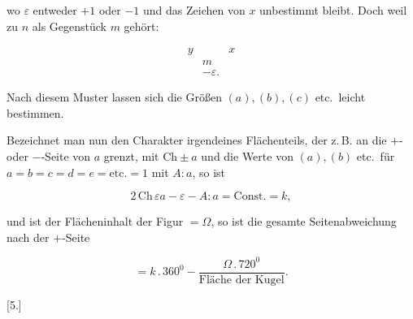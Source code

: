 %
\noindent wo $\varepsilon$ entweder $+1$ oder $-1$ und das Zeichen von $x$
unbestimmt bleibt. Doch weil zu $n$ als Gegenstück $m$ gehört:

\[
\begin{array}{ccc}
y&&x \\
&m& \\
&-\varepsilon.&
\end{array}
\]

\noindent Nach diesem Muster lassen sich die Größen $(a), (b),
(c)$ etc.\ leicht bestimmen.

Bezeichnet man nun den Charakter irgendeines Flächenteils, der
z.\,B. an die $+$- oder $-$-Seite von $a$ grenzt, mit $\mathrm{Ch}\pm a$
und die Werte von $(a), (b)$ etc.\ für $a=b=c=d=e=\text{etc.}=1$ mit
$A:a$, so ist

\[
2\,\mathrm{Ch}\,\varepsilon a - \varepsilon - A:a = \text{Const.} = k,
\]

\noindent und ist der Flächeninhalt der Figur $= \Omega$, so ist die gesamte Seitenabweichung
nach der $+$-Seite

\[
= k\,.\,360^0 - \frac{\Omega\,.\,720^0}{\text{Fläche der Kugel}}.
\]

\begin{center}[5.]\end{center}

\begin{center}\end{center}
